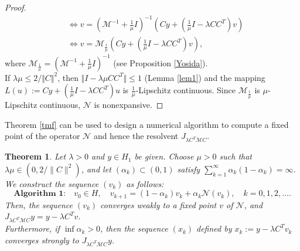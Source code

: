 \documentclass[11pt]{article}
\theoremstyle{plain}
\newtheorem{theorem}{Theorem}
\begin{document}
{\begin{proof}
{\begin{align*}
&\Leftrightarrow v = (\mathcal{M}^{-1} + \frac{1}{\mu} I)^{-1}(Cy + (\frac{1}{\mu} I - \lambda CC^T)v) \\
&\Leftrightarrow v = \mathcal{M}_{\frac{1}{\mu}} (Cy + (\frac{1}{\mu} I - \lambda CC^T)v),
\end{align*}
where  $\mathcal{M}_{\frac{1}{\mu}}=(\mathcal{M}^{-1}+\frac{1}{\mu} I)^{-1}$ (see Proposition \ref{Yosida}).} \\
If ${\lambda}{\mu}\le 2/\Vert C\Vert^2$, then  $\Vert I-{\lambda}{\mu} CC^T \Vert \le 1$ (Lemma \ref{lem1}) and the mapping $L(u):=Cy+(\frac{1}{\mu} I-\lambda CC^T)u$ is $\frac{1}{\mu}$-Lipschitz continuous. Since $\mathcal{M}_{\frac{1}{\mu}}$ is ${\mu}$-Lipschitz continuous, $\mathcal{N}$ is {nonexpansive}. 
\end{proof}
Theorem \ref{tmf} can be used to design a numerical algorithm to compute a fixed point of the operator $\mathcal{N}$ and hence the resolvent  $J_{\lambda C^T\mathcal{M}C}$.
{
\begin{theorem}\label{algokm}
Let $\lambda > 0$ and $y \in H_1$ be given. Choose $\mu>0$ such that ${\lambda}{\mu} \in (0, 2/\|C\|^2)$, and let $(\alpha_k) \subset (0,1)$ satisfy $\sum_{k=1}^\infty \alpha_k (1 - \alpha_k) = \infty$. We construct the sequence $(v_k)$ as follows:
\begin{equation*}
\textbf{Algorithm 1:} \quad v_0 \in H, \quad v_{k+1} = (1 - \alpha_k)v_k + \alpha_k \mathcal{N}(v_k), \quad k = 0, 1, 2, \ldots.
\end{equation*}
Then, the sequence $(v_k)$ converges weakly to a fixed point $v$ of $\mathcal{N}$, and $J_{\lambda C^T \mathcal{M} C} y = y - \lambda C^T v$.\\
Furthermore, if $\inf \alpha_k > 0$, then the sequence $(x_k)$ defined by $x_k := y - \lambda C^T v_k$ converges strongly to $J_{\lambda C^T \mathcal{M} C} y$.

\end{theorem}}}
\end{document}
